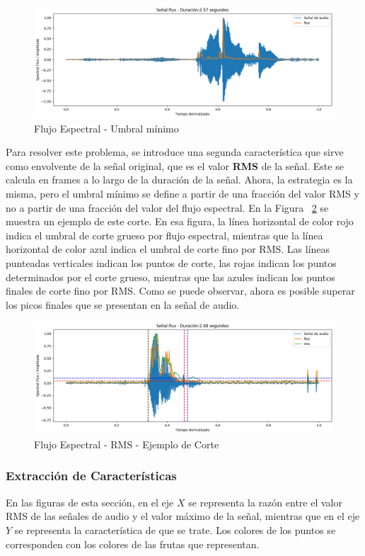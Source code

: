 \documentclass[a4paper, 12pt]{article}
\begin{document}
\begin{figure}[h]
    \centering
    \includegraphics[width=0.8\linewidth]{trimming3.png}
    \caption{Flujo Espectral - Umbral mínimo}
    \label{trimming 3}
\end{figure}

Para resolver este problema, se introduce una segunda característica que sirve como envolvente de la señal original, que es el valor \textbf{RMS} de la señal. Este se calcula en frames a lo largo de la duración de la señal. Ahora, la estrategia es la misma, pero el umbral mínimo se define a partir de una fracción del valor RMS y no a partir de una fracción del valor del flujo espectral. En la Figura ~\ref{trimming 4} se muestra un ejemplo de este corte. En esa figura, la línea horizontal de color rojo indica el umbral de corte grueso por flujo espectral, mientras que la línea horizontal de color azul indica el umbral de corte fino por RMS. Las líneas punteadas verticales indican los puntos de corte, las rojas indican los puntos determinados por el corte grueso, mientras que las azules indican los puntos finales de corte fino por RMS. Como se puede observar, ahora es posible superar los picos finales que se presentan en la señal de audio.


\begin{figure}[h]
    \centering
    \includegraphics[width=0.8\linewidth]{trimming4.png}
    \caption{Flujo Espectral - RMS - Ejemplo de Corte}
    \label{trimming 4}
\end{figure}
\subsubsection{Extracción de Características}
En las figuras de esta sección, en el eje \(X\) se representa la razón entre el valor RMS de las señales de audio y el valor máximo de la señal, mientras que en el eje \(Y\) se representa la característica de que se trate. Los colores de los puntos se corresponden con los colores de las frutas que representan.
\end{document}
